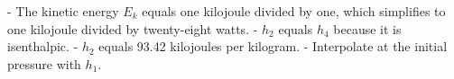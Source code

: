 - The kinetic energy \( E_k \) equals one kilojoule divided by one, which simplifies to one kilojoule divided by twenty-eight watts.
- \( h_2 \) equals \( h_4 \) because it is isenthalpic.
- \( h_2 \) equals 93.42 kilojoules per kilogram.
- Interpolate at the initial pressure with \( h_1 \).
